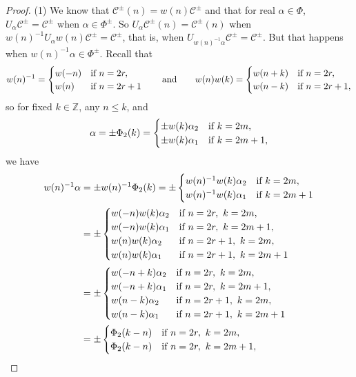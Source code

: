 \documentclass[pdftex]{sigma}
\numberwithin{equation}{section}
\def\Z{\mathbb{Z}}
\def\a{\alpha}
\def\roots{{\Phi}}
\def\cC{\mathcal C}
\begin{document}
\begin{proof} (1) We know that $\cC^\pm(n) = w(n) \cC^\pm$ and that for real $\a\in\roots$, $U_\a \cC^\pm = \cC^\pm$
when $\a\in\roots^\pm$. So $U_\a \cC^\pm(n) = \cC^\pm(n)$ when $w(n)^{-1} U_\a w(n) \cC^\pm = \cC^\pm$, that is,
when $U_{w(n)^{-1} \a} \cC^\pm = \cC^\pm$. But that happens when $w(n)^{-1} \a \in\roots^\pm$. Recall that
\[w(n)^{-1} = \begin{cases} w(-n)& \hbox{if }n = 2r,\\ w(n) & \hbox{if }n = 2r+1\end{cases}\qquad\hbox{and}\qquad
w(n)w(k) = \begin{cases} w(n+k)& \hbox{if }n = 2r,\\ w(n-k)& \hbox{if }n = 2r+1,\end{cases}\]
so for fixed $k\in\Z$, any $n\leq k$, and
\[\a = \pm\roots_2(k) = \begin{cases} \pm w(k) \a_2& \hbox{if }k = 2m, \\ \pm w(k) \a_{1}& \hbox{if }k = 2m+1, \end{cases}\]
we have
\begin{align*}
w(n)^{-1} \a & = \pm w(n)^{-1} \roots_2(k) =
\pm \begin{cases} w(n)^{-1} w(k) \a_2& \hbox{if }k = 2m, \\
w(n)^{-1} w(k) \a_{1}& \hbox{if }k = 2m+1 \end{cases}\\
 & = \pm \begin{cases} w(-n) w(k) \a_2& \hbox{if }n = 2r,\ k = 2m, \\
w(-n) w(k) \a_{1}& \hbox{if }n = 2r,\ k = 2m+1, \\
w(n) w(k) \a_2& \hbox{if }n = 2r+1,\ k = 2m, \\
w(n) w(k) \a_{1}& \hbox{if }n = 2r+1,\ k = 2m+1
\end{cases}\\
& = \pm \begin{cases} w(-n+k) \a_2&\hbox{if }n = 2r,\ k = 2m, \\
w(-n+k) \a_{1}& \hbox{if }n = 2r,\ k = 2m+1, \\
w(n-k) \a_2& \hbox{if }n = 2r+1,\ k = 2m, \\
w(n-k) \a_{1}& \hbox{if }n = 2r+1,\ k = 2m+1
\end{cases}\\
& = \pm \begin{cases} \roots_2(k-n)& \hbox{if }n = 2r,\ k = 2m, \\
\roots_2(k-n)& \hbox{if }n = 2r,\ k = 2m+1, \\

\end{cases}
\end{align*}
\end{proof}
\end{document}
